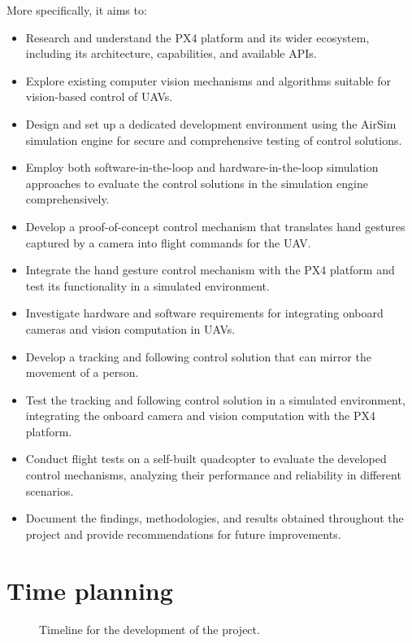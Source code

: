 More specifically, it aims to:
\begin{itemize}
    \item Research and understand the PX4 platform and its wider ecosystem, including its architecture, capabilities, and available APIs.
    \item Explore existing computer vision mechanisms and algorithms suitable for vision-based control of UAVs.
    \item Design and set up a dedicated development environment using the AirSim simulation engine for secure and comprehensive testing of control solutions.
    \item Employ both software-in-the-loop and hardware-in-the-loop simulation approaches to evaluate the control solutions in the simulation engine comprehensively.
    \item Develop a proof-of-concept control mechanism that translates hand gestures captured by a camera into flight commands for the UAV.
    \item Integrate the hand gesture control mechanism with the PX4 platform and test its functionality in a simulated environment.
    \item Investigate hardware and software requirements for integrating onboard cameras and vision computation in UAVs.
    \item Develop a tracking and following control solution that can mirror the movement of a person.
    \item Test the tracking and following control solution in a simulated environment, integrating the onboard camera and vision computation with the PX4 platform.
    \item Conduct flight tests on a self-built quadcopter to evaluate the developed control mechanisms, analyzing their performance and reliability in different scenarios.
    \item Document the findings, methodologies, and results obtained throughout the project and provide recommendations for future improvements.
\end{itemize}


\section{Time planning}
\label{sec:time-planning}

\begin{figure}[H]
  \centering
  \caption{Timeline for the development of the project.}
  \label{fig:project-timeline}
\end{figure}

